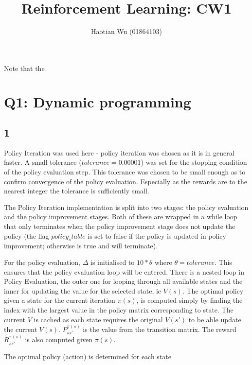 \documentclass[12pt,a4paper]{report}
\title{Reinforcement Learning: CW1}
\author{Haotian Wu (01864103)}
\begin{document}
\maketitle

Note that the 
\section*{Q1: Dynamic programming}
\subsection*{1}
Policy Iteration was used here - policy iteration was chosen as 
it is in general faster.
A small tolerance ($tolerance = 0.00001$) was set for the 
stopping condition of the policy evaluation step. This 
tolerance was chosen to be small enough as to confirm convergence 
of the policy evaluation. Especially as the rewards are to the 
nearest integer the tolerance is sufficiently small.

The Policy Iteration implementation is split into two
stages: the policy evaluation and the policy improvement stages.
Both of these are wrapped in a while loop that only terminates 
when the policy improvement stage does not update the policy 
(the flag $policy_stable$ is set to false if the policy is updated
in policy improvement; otherwise is true and will terminate).

For the policy evaluation, $\Delta$ is initialised to $10 * \theta$ 
where $\theta = tolerance$. This ensures that the policy evaluation
loop will be entered. 
There is a nested loop in Policy Evaluation, the outer one for looping 
through all available states and the inner for updating the value 
for the selected state, ie $V(s)$.
The optimal policy given a state for the current iteration $\pi(s)$,
is computed simply by finding the index with the largest value
in the policy matrix corresponding to state.
The current $V$ is cached as each state requires the original
$V(s')$ to be able update the current $V(s)$.
$P^{\pi(s)}_{s s'}$ is the value from the transition matrix. 
The reward $R^{\pi(s)}_{s s'}$ is also computed given $\pi(s)$.

The optimal policy (action) is determined for each state

\end{document}
